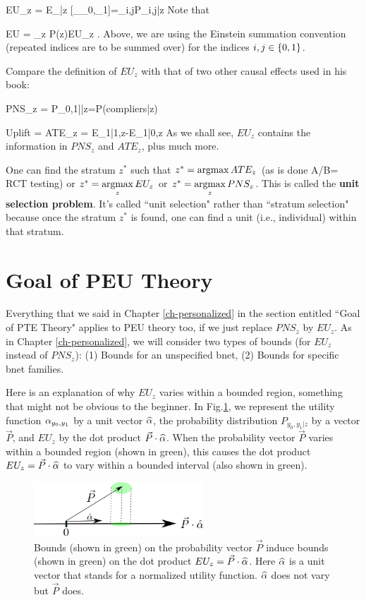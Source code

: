 \beq
EU_z = E_{|z}
[\alp_{\rvy_0,\rvy_1}]=\alp_{i,j}P_{i,j|z}
\eeq
Note that

\beq
EU = \sum_z  P(z)EU_z
\;.
\eeq
Above, we are using the Einstein
 summation convention
(repeated indices are to be summed over)
for the indices $i,j\in \{0,1\}$.

Compare the definition of $EU_z$
with that of two other causal effects used 
in his book:

\beq
PNS_z = P_{0,1||z}=P(compliers|z)
\eeq

\beq
Uplift = ATE_z = E_{1|1,z}-E_{1|0,z}
\eeq
As we shall see,
$EU_z$ contains the information
in $PNS_z$ and $ATE_z$,  plus much more.

 
One can
find the stratum $z^*$
such that
$z^*=\mathop{\mathrm{argmax}}\limits ATE_z$ (as is done A/B= RCT testing) or
 $z^*=\mathop{\mathrm{argmax}}\limits_z EU_z$ or
$z^*=\mathop{\mathrm{argmax}}\limits_z PNS_z$.
This is called the
{\bf unit selection problem}.
It's called ``unit selection"
rather than ``stratum selection" 
because once the  
stratum $z^*$ is found,
one can find a unit 
(i.e., individual) within
that stratum.







\section{Goal of PEU Theory}
Everything that we said 
in Chapter \ref{ch-personalized}
in the section entitled ``Goal 
of PTE Theory"
applies to PEU theory too,
if we just replace $PNS_z$
by $EU_z$.
As in Chapter \ref{ch-personalized}, 
we will consider two types of bounds (for
$EU_z$ instead of $PNS_z$): 
(1) Bounds for an unspecified bnet,
(2) Bounds for specific bnet families.


Here is
an explanation 
of why $EU_z$
varies within a bounded region,
something that might 
not be obvious to the beginner.
In  Fig.\ref{fig-peu-utility},
we represent the utility
function $\alpha_{y_0, y_1}$
by a unit vector ${\widehat{\alpha}}$,
the probability distribution 
$P_{y_0, y_1|z}$ by a vector $\vec{P}$,
and $EU_z$ by the dot product 
$\vec{P}\cdot {\widehat{\alpha}}$.
When the probability
vector $\vec{P}$ varies within a bounded region
(shown in green),
this causes
the dot 
product $EU_z=\vec{P}\cdot {\widehat{\alpha}}$
to vary within a bounded interval (also
shown in green).



\begin{figure}[h!]
\centering
\includegraphics[width=2.5in]
{personalized-exp-util/utility.png}
\caption{Bounds (shown in green)
on the probability
vector $\vec{P}$
induce bounds (shown in green) on the dot 
product $EU_z=\vec{P}\cdot {\widehat{\alpha}}$.
Here ${\widehat{\alpha}}$ is a unit vector
that stands for a normalized 
utility function. ${\widehat{\alpha}}$
does not vary but $\vec{P}$ does.
} 
\label{fig-peu-utility}
\end{figure}

